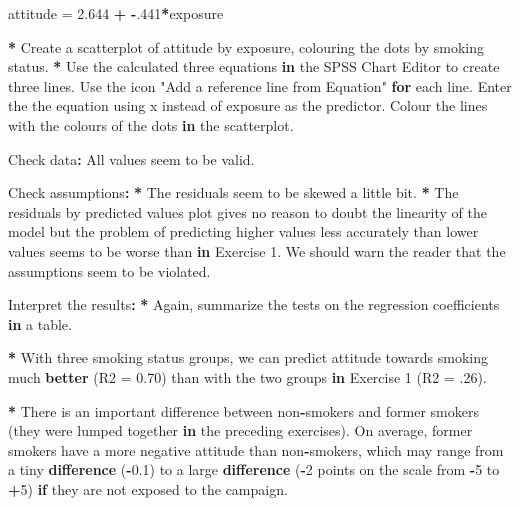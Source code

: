\documentclass[a4paper]{book}
\newenvironment{Shaded}{\begin{snugshade}}{\end{snugshade}}
\newcommand{\KeywordTok}[1]{\textcolor[rgb]{0,0,0}{\textbf{#1}}}
\newcommand{\DataTypeTok}[1]{\textcolor[rgb]{0,0,0}{#1}}
\newcommand{\DecValTok}[1]{\textcolor[rgb]{0.00,0.00,0.00}{#1}}
\newcommand{\FloatTok}[1]{\textcolor[rgb]{0.00,0.00,0.00}{#1}}
\newcommand{\StringTok}[1]{\textcolor[rgb]{0.00,0.00,0.00}{#1}}
\newcommand{\ControlFlowTok}[1]{\textcolor[rgb]{0.00,0.00,0.00}{\textbf{#1}}}
\newcommand{\OperatorTok}[1]{\textcolor[rgb]{0.00,0.00,0.00}{\textbf{#1}}}
\newcommand{\ErrorTok}[1]{\textcolor[rgb]{0.00,0.00,0.00}{\textbf{#1}}}
\newcommand{\NormalTok}[1]{#1}
\theoremstyle{definition}
\theoremstyle{definition}
\theoremstyle{definition}
\theoremstyle{remark}
\begin{document}
\begin{Shaded}
\begin{Highlighting}[]
\NormalTok{attitude =}\StringTok{ }\FloatTok{2.644} \OperatorTok{+}\StringTok{ }\OperatorTok{-}\NormalTok{.}\DecValTok{441}\OperatorTok{*}\NormalTok{exposure  }
  
\OperatorTok{*}\StringTok{ }\NormalTok{Create a scatterplot of attitude by exposure, colouring the dots by smoking}
\NormalTok{status.}
\OperatorTok{*}\StringTok{ }\NormalTok{Use the calculated three equations }\ControlFlowTok{in}\NormalTok{ the SPSS Chart Editor to create three}
\NormalTok{lines. Use the icon }\StringTok{"Add a reference line from Equation"} \ControlFlowTok{for}\NormalTok{ each line. Enter}
\NormalTok{the the equation using x instead of exposure as the predictor. Colour the}
\NormalTok{lines with the colours of the dots }\ControlFlowTok{in}\NormalTok{ the scatterplot.}
  
\NormalTok{Check data}\OperatorTok{:}\StringTok{  }
\StringTok{  }
\NormalTok{All values seem to be valid.  }
  
\NormalTok{Check assumptions}\OperatorTok{:}\StringTok{  }
\StringTok{  }
\ErrorTok{*}\StringTok{ }\NormalTok{The residuals seem to be skewed a little bit.  }
\OperatorTok{*}\StringTok{ }\NormalTok{The residuals by predicted values plot gives no reason to doubt the}
\NormalTok{linearity of the model but the problem of predicting higher values less}
\NormalTok{accurately than lower values seems to be worse than }\ControlFlowTok{in}\NormalTok{ Exercise }\DecValTok{1}\NormalTok{. We should}
\NormalTok{warn the reader that the assumptions seem to be violated.}
  
\NormalTok{Interpret the results}\OperatorTok{:}\StringTok{  }
\StringTok{  }
\ErrorTok{*}\StringTok{ }\NormalTok{Again, summarize the tests on the regression coefficients }\ControlFlowTok{in}\NormalTok{ a table.  }
  
\OperatorTok{*}\StringTok{ }\NormalTok{With three smoking status groups, we can predict attitude towards smoking}
\NormalTok{much }\KeywordTok{better}\NormalTok{ (}\DataTypeTok{R2 =} \FloatTok{0.70}\NormalTok{) than with the two groups }\ControlFlowTok{in}\NormalTok{ Exercise }\DecValTok{1}\NormalTok{ (}\DataTypeTok{R2 =}\NormalTok{ .}\DecValTok{26}\NormalTok{).}
  
\OperatorTok{*}\StringTok{ }\NormalTok{There is an important difference between non}\OperatorTok{-}\NormalTok{smokers and former smokers}
\NormalTok{(they were lumped together }\ControlFlowTok{in}\NormalTok{ the preceding exercises). On average, former}
\NormalTok{smokers have a more negative attitude than non}\OperatorTok{-}\NormalTok{smokers, which may range from a}
\NormalTok{tiny }\KeywordTok{difference}\NormalTok{ (}\OperatorTok{-}\FloatTok{0.1}\NormalTok{) to a large }\KeywordTok{difference}\NormalTok{ (}\OperatorTok{-}\DecValTok{2}\NormalTok{ points on the scale from }\OperatorTok{-}\DecValTok{5}\NormalTok{ to}
\OperatorTok{+}\DecValTok{5}\NormalTok{) }\ControlFlowTok{if}\NormalTok{ they are not exposed to the campaign.}
  

\end{Highlighting}
\end{Shaded}
\end{document}

